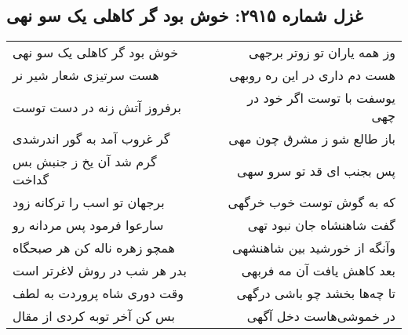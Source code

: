 \begin{center}
\section*{غزل شماره ۲۹۱۵: خوش بود گر کاهلی یک سو نهی}
\label{sec:2915}
\begin{longtable}{l p{0.5cm} r}
خوش بود گر کاهلی یک سو نهی
&&
وز همه یاران تو زوتر برجهی
\\
هست سرتیزی شعار شیر نر
&&
هست دم داری در این ره روبهی
\\
برفروز آتش زنه در دست توست
&&
یوسفت با توست اگر خود در چهی
\\
گر غروب آمد به گور اندرشدی
&&
باز طالع شو ز مشرق چون مهی
\\
گرم شد آن یخ ز جنبش بس گداخت
&&
پس بجنب ای قد تو سرو سهی
\\
برجهان تو اسب را ترکانه زود
&&
که به گوش توست خوب خرگهی
\\
سارعوا فرمود پس مردانه رو
&&
گفت شاهنشاه جان نبود تهی
\\
همچو زهره ناله کن هر صبحگاه
&&
وآنگه از خورشید بین شاهنشهی
\\
بدر هر شب در روش لاغرتر است
&&
بعد کاهش یافت آن مه فربهی
\\
وقت دوری شاه پروردت به لطف
&&
تا چه‌ها بخشد چو باشی درگهی
\\
بس کن آخر توبه کردی از مقال
&&
در خموشی‌هاست دخل آگهی
\\
\end{longtable}
\end{center}
